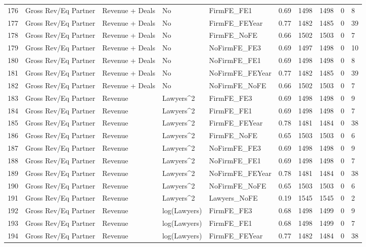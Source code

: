 \begin{table}[ht]
\begin{tabular}{rlllllllll}
  176 & Gross Rev/Eq Partner & Revenue + Deals & No & FirmFE\_FE1 & 0.69 & 1498 & 1498 & 0 & 8 \\ 
  177 & Gross Rev/Eq Partner & Revenue + Deals & No & FirmFE\_FEYear & 0.77 & 1482 & 1485 & 0 & 39 \\ 
  178 & Gross Rev/Eq Partner & Revenue + Deals & No & FirmFE\_NoFE & 0.66 & 1502 & 1503 & 0 & 7 \\ 
  179 & Gross Rev/Eq Partner & Revenue + Deals & No & NoFirmFE\_FE3 & 0.69 & 1497 & 1498 & 0 & 10 \\ 
  180 & Gross Rev/Eq Partner & Revenue + Deals & No & NoFirmFE\_FE1 & 0.69 & 1498 & 1498 & 0 & 8 \\ 
  181 & Gross Rev/Eq Partner & Revenue + Deals & No & NoFirmFE\_FEYear & 0.77 & 1482 & 1485 & 0 & 39 \\ 
  182 & Gross Rev/Eq Partner & Revenue + Deals & No & NoFirmFE\_NoFE & 0.66 & 1502 & 1503 & 0 & 7 \\ 
  183 & Gross Rev/Eq Partner & Revenue & Lawyers^2 & FirmFE\_FE3 & 0.69 & 1498 & 1498 & 0 & 9 \\ 
  184 & Gross Rev/Eq Partner & Revenue & Lawyers^2 & FirmFE\_FE1 & 0.69 & 1498 & 1498 & 0 & 7 \\ 
  185 & Gross Rev/Eq Partner & Revenue & Lawyers^2 & FirmFE\_FEYear & 0.78 & 1481 & 1484 & 0 & 38 \\ 
  186 & Gross Rev/Eq Partner & Revenue & Lawyers^2 & FirmFE\_NoFE & 0.65 & 1503 & 1503 & 0 & 6 \\ 
  187 & Gross Rev/Eq Partner & Revenue & Lawyers^2 & NoFirmFE\_FE3 & 0.69 & 1498 & 1498 & 0 & 9 \\ 
  188 & Gross Rev/Eq Partner & Revenue & Lawyers^2 & NoFirmFE\_FE1 & 0.69 & 1498 & 1498 & 0 & 7 \\ 
  189 & Gross Rev/Eq Partner & Revenue & Lawyers^2 & NoFirmFE\_FEYear & 0.78 & 1481 & 1484 & 0 & 38 \\ 
  190 & Gross Rev/Eq Partner & Revenue & Lawyers^2 & NoFirmFE\_NoFE & 0.65 & 1503 & 1503 & 0 & 6 \\ 
  191 & Gross Rev/Eq Partner & Revenue & Lawyers^2 & Lawyers\_NoFE & 0.19 & 1545 & 1545 & 0 & 2 \\ 
  192 & Gross Rev/Eq Partner & Revenue & log(Lawyers) & FirmFE\_FE3 & 0.68 & 1498 & 1499 & 0 & 9 \\ 
  193 & Gross Rev/Eq Partner & Revenue & log(Lawyers) & FirmFE\_FE1 & 0.68 & 1498 & 1499 & 0 & 7 \\ 
  194 & Gross Rev/Eq Partner & Revenue & log(Lawyers) & FirmFE\_FEYear & 0.77 & 1482 & 1484 & 0 & 38 \\ 

\end{tabular}
\end{table}
